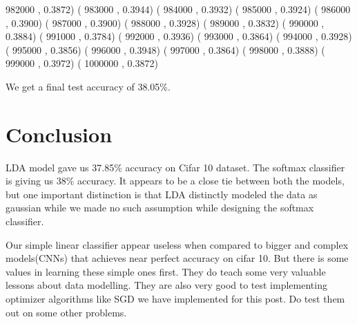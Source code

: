 \documentclass[10pt]{article}
\begin{document}
982000 , 0.3872)  ( 983000 , 0.3944)  ( 984000 , 0.3932)  ( 985000 , 0.3924)  ( 986000 , 0.3900)  ( 987000 , 0.3900)  ( 988000 , 0.3928)  ( 989000 , 0.3832)  ( 990000 , 0.3884)  ( 991000 , 0.3784)  ( 992000 , 0.3936)  ( 993000 , 0.3864)  ( 994000 , 0.3928)  ( 995000 , 0.3856)  ( 996000 , 0.3948)  ( 997000 , 0.3864)  ( 998000 , 0.3888)  ( 999000 , 0.3972)  ( 1000000 , 0.3872)
% 
%  

We get a final test accuracy of 38.05\%.
\section{Conclusion}
LDA model gave us 37.85\% accuracy on Cifar 10 dataset. The softmax classifier is giving us 38\% accuracy. It appears to be a close tie between both the models, but one important distinction is that LDA distinctly modeled the data as gaussian while we made no such assumption while designing the softmax classifier. 

Our simple linear classifier appear useless when compared to bigger and complex models(CNNs) that achieves near perfect accuracy on cifar 10. But there is some values in learning these simple ones first. They do teach some very valuable lessons about data modelling. They are also very good to test implementing optimizer algorithms like SGD we have implemented for this post. Do test them out on some other problems.
\end{document}
